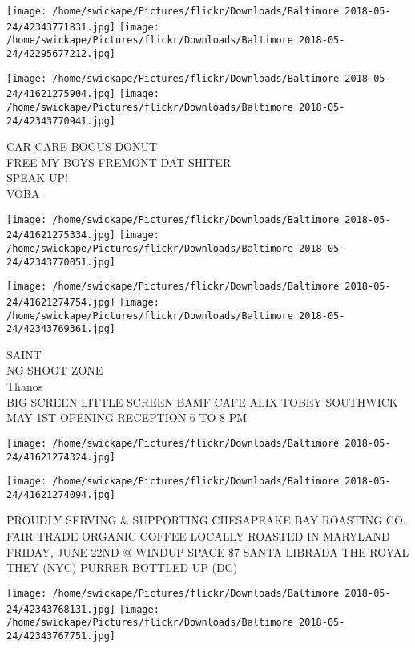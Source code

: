 \documentclass[10pt,letterpaper]{article}
\begin{document}
\texttt{[image: /home/swickape/Pictures/flickr/Downloads/Baltimore 2018-05-24/42343771831.jpg]}
\texttt{[image: /home/swickape/Pictures/flickr/Downloads/Baltimore 2018-05-24/42295677212.jpg]}

\texttt{[image: /home/swickape/Pictures/flickr/Downloads/Baltimore 2018-05-24/41621275904.jpg]}
\texttt{[image: /home/swickape/Pictures/flickr/Downloads/Baltimore 2018-05-24/42343770941.jpg]}

CAR CARE BOGUS DONUT\\
FREE MY BOYS FREMONT DAT SHITER\\
SPEAK UP!\\
VOBA\\
\pagebreak

\texttt{[image: /home/swickape/Pictures/flickr/Downloads/Baltimore 2018-05-24/41621275334.jpg]}
\texttt{[image: /home/swickape/Pictures/flickr/Downloads/Baltimore 2018-05-24/42343770051.jpg]}

\texttt{[image: /home/swickape/Pictures/flickr/Downloads/Baltimore 2018-05-24/41621274754.jpg]}
\texttt{[image: /home/swickape/Pictures/flickr/Downloads/Baltimore 2018-05-24/42343769361.jpg]}

SAINT\\
NO SHOOT ZONE\\
Thanos\\
BIG SCREEN LITTLE SCREEN BAMF CAFE ALIX TOBEY SOUTHWICK MAY 1ST OPENING RECEPTION 6 TO 8 PM\\
\pagebreak

\texttt{[image: /home/swickape/Pictures/flickr/Downloads/Baltimore 2018-05-24/41621274324.jpg]}

\vspace{0.25in}
\texttt{[image: /home/swickape/Pictures/flickr/Downloads/Baltimore 2018-05-24/41621274094.jpg]}

PROUDLY SERVING \& SUPPORTING CHESAPEAKE BAY ROASTING CO. FAIR TRADE ORGANIC COFFEE LOCALLY ROASTED IN MARYLAND\\
FRIDAY, JUNE 22ND @ WINDUP SPACE \$7 SANTA LIBRADA THE ROYAL THEY (NYC) PURRER BOTTLED UP (DC)\\
\pagebreak

\texttt{[image: /home/swickape/Pictures/flickr/Downloads/Baltimore 2018-05-24/42343768131.jpg]}
\texttt{[image: /home/swickape/Pictures/flickr/Downloads/Baltimore 2018-05-24/42343767751.jpg]}
\end{document}

